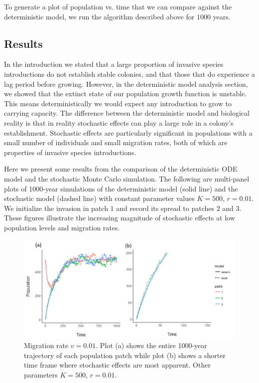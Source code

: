 \documentclass[12pt, openany]{book}
\theoremstyle{definition}
\theoremstyle{remark}
\numberwithin{equation}{chapter}
\numberwithin{figure}{chapter}
\begin{document}
To generate a plot of population vs. time that we can compare against the deterministic model, we run the algorithm described above for $1000$ years.

\subsection{Results}
In the introduction we stated that a large proportion of invasive species introductions do not establish stable colonies, and that those that do experience a lag period before growing. However, in the deterministic model analysis section, we showed that the extinct state of our population growth function is unstable. This means deterministically we would expect any introduction to grow to carrying capacity. The difference between the deterministic model and biological reality is that in reality stochastic effects can play a large role in a colony's establishment. Stochastic effects are particularly significant in populations with a small number of individuals and small migration rates, both of which are properties of invasive species introductions. 

Here we present some results from the comparison of the deterministic ODE model and the stochastic Monte Carlo simulation. The following are multi-panel plots of 1000-year simulations of the deterministic model (solid line) and the stochastic model (dashed line) with constant parameter values $K = 500$, $r = 0.01$. We initialize the invasion in patch $1$ and record its spread to patches $2$ and $3$. These figures illustrate the increasing magnitude of stochastic effects at low population levels and migration rates.

\begin{figure}[t!]
\begin{center}
       \includegraphics[width=1.0\textwidth]{combinedv01.png}
       \caption{Migration rate $v = 0.01$. Plot (a) shows the entire 1000-year trajectory of each population patch while plot (b) shows a shorter time frame where stochastic effects are most apparent. Other parameters $K = 500$, $r = 0.01$.\label{combinedv01}}
\end{center}
\end{figure}  
\end{document}
